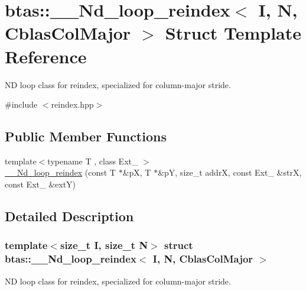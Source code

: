 \hypertarget{structbtas_1_1_____nd__loop__reindex_3_01_i_00_01_n_00_01_cblas_col_major_01_4}{
\section{btas::\_\-\_\-Nd\_\-loop\_\-reindex$<$ I, N, CblasColMajor $>$ Struct Template Reference}
\label{structbtas_1_1_____nd__loop__reindex_3_01_i_00_01_n_00_01_cblas_col_major_01_4}
}


ND loop class for reindex, specialized for column-\/major stride.  


{\ttfamily \#include $<$reindex.hpp$>$}\subsection*{Public Member Functions}
\begin{DoxyCompactItemize}
\item 
{\footnotesize template$<$typename T , class Ext\_\- $>$ }\\\hyperlink{structbtas_1_1_____nd__loop__reindex_3_01_i_00_01_n_00_01_cblas_col_major_01_4_a6b103d32a003b00633a0f70e66d037e4}{\_\-\_\-Nd\_\-loop\_\-reindex} (const T $\ast$\&pX, T $\ast$\&pY, size\_\-t addrX, const Ext\_\- \&strX, const Ext\_\- \&extY)
\end{DoxyCompactItemize}


\subsection{Detailed Description}
\subsubsection*{template$<$size\_\-t I, size\_\-t N$>$ struct btas::\_\-\_\-Nd\_\-loop\_\-reindex$<$ I, N, CblasColMajor $>$}

ND loop class for reindex, specialized for column-\/major stride. 

